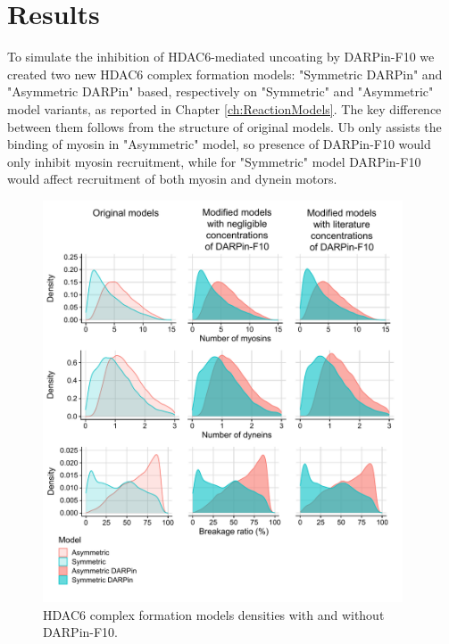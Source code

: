 \section{Results}

To simulate the inhibition of HDAC6-mediated uncoating by DARPin-F10 we created two new HDAC6 complex formation models: "Symmetric DARPin" and "Asymmetric DARPin" based, respectively on "Symmetric" and "Asymmetric" model variants, as reported in Chapter \ref{ch:ReactionModels}. The key difference between them follows from the structure of original models. Ub only assists the binding of myosin in "Asymmetric" model, so presence of DARPin-F10 would only inhibit myosin recruitment, while for "Symmetric" model DARPin-F10 would affect recruitment of both myosin and dynein motors.

\begin{figure}
\begin{center}
\includegraphics[width=0.95\textwidth, trim={0cm 0cm 0cm 0cm}, clip]{D_chapters/3_DARPinModels/Density_DARPin.pdf}
\caption[HDAC6 complex formation models densities with and without DARPin-F10]%
{HDAC6 complex formation models densities with and without DARPin-F10.}
\label{figure:darpinDensities}
\end{center}
\end{figure}

